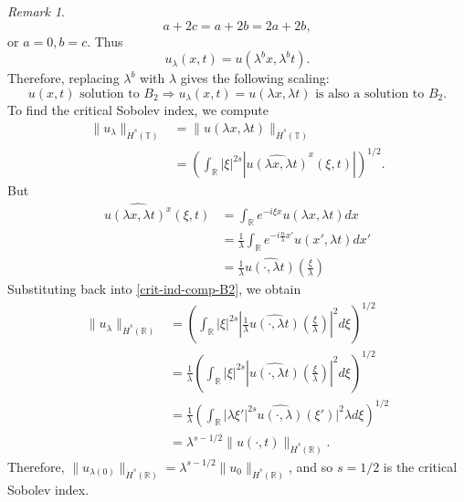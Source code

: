 \documentclass[12pt,reqno]{amsart}
\numberwithin{equation}{section}  %
\numberwithin{figure}{section}
\newcommand{\rr}{\mathbb{R}}
\newcommand{\ci}{\mathbb{T}}
\newcommand{\wh}{\widehat}
\theoremstyle{plain}
\theoremstyle{definition}
\theoremstyle{remark}
\newtheorem{remark}{Remark}
\begin{document}
\begin{itemize}
\begin{framed}
\begin{remark}
$$
a+2c=a+2b=2a+2b,
$$
or
$
a=0, b=c.
$
  Thus
\[
u_\lambda (x, t) = u(\lambda^{b}x,  \lambda^{b} t).
\]
%
%
Therefore, replacing  $ \lambda^b$ with  $ \lambda$ gives the following scaling:
%
\begin{equation}
\label{B2-scal}
\boxed{
u(x, t) \text{ solution to }  B_2
 \Longrightarrow 
u_\lambda (x, t) = u(\lambda x, \lambda t)  \text { is also a
solution to }  B_2. 
}
\end{equation}
\label{rem:scaling-B2}
To find the critical Sobolev index, we compute
\\
%
%
\begin{equation}
\begin{split}
  \| u_{\lambda} \|_{\dot{H}^s(\ci)} 
  & =  \| u(\lambda x, \lambda t) \|_{\dot{H}^{s}(\ci)}
  \\
  & = \left( \int_{\rr} | \xi |^{2s} | \wh{u(\lambda x,
  \lambda t)}^x (\xi, t)| \right)^{1/2}.
\end{split}
\label{crit-ind-comp-B2}
\end{equation}
%
But
%
\\
%
\begin{equation*}
\begin{split}
  \wh{u(\lambda x, \lambda t)^x}(\xi, t)
  & = \int_{\rr}e^{-i\xi x}u(\lambda x, \lambda t) dx
  \\
  & = \frac{1}{\lambda} \int_{\rr}e^{-i \frac{n}{\lambda} x'}u(x',
  \lambda t) dx'
  \\
  & = \frac{1}{\lambda} \wh{u(\cdot, \lambda t)}(\frac{\xi}{\lambda})
\end{split}
\end{equation*}
%
%
Substituting back into \eqref{crit-ind-comp-B2}, we obtain
%
%
\begin{equation*}
\begin{split}
  \| u_{\lambda} \|_{\dot{H}^s(\rr)} 
  & = \left( \int_{\rr} | \xi |^{2s} |
  \frac{1}{\lambda}\wh{u(\cdot, \lambda t)}(\frac{\xi}{\lambda}) |^2 d \xi
  \right)^{1/2}
  \\
  & = \frac{1}{\lambda} \left( \int_{\rr}| \xi |^{2s} | \wh{u(\cdot,
  \lambda t)}(\frac{\xi}{\lambda}) |^2 d \xi  \right)^{1/2}
  \\
  & = \frac{1}{\lambda} \left( \int_{\rr} | \lambda \xi' |^{2s} 
  \wh{u(\cdot, \lambda)}(\xi') |^2 \lambda d \xi
  \right)^{1/2}
  \\
  & = \lambda^{s - 1/2} \|u(\cdot, t) \|_{\dot{H}^s (\rr)}.
\end{split}
\end{equation*}
%
%
Therefore, $\| u_{\lambda(0)} \|_{\dot{H}^s(\rr)} = \lambda^{s - 1/2} \|
u_{0} \|_{\dot{H}^{s}(\rr)}$, and so $s=1/2$ is the critical Sobolev index.
\end{remark}
\end{framed}


\end{itemize}
\end{document}
